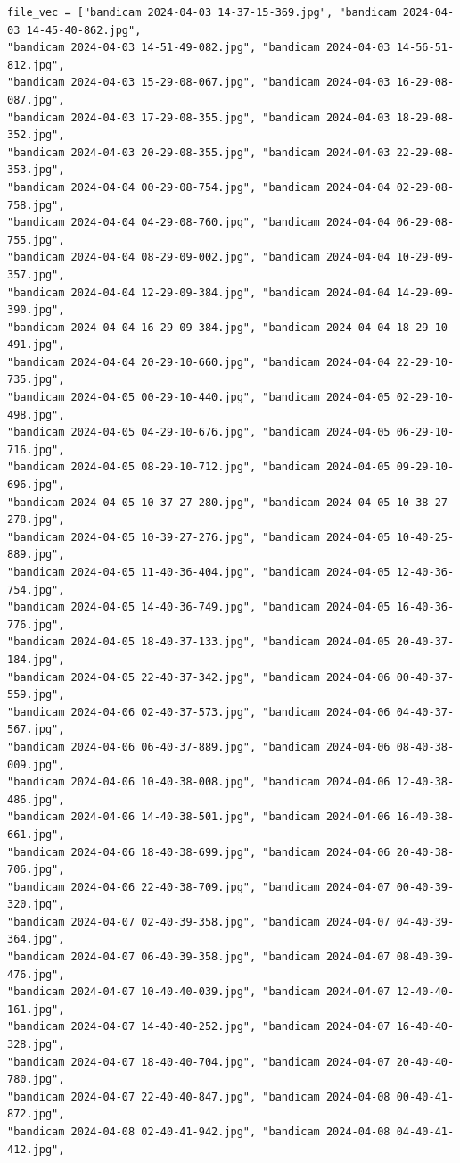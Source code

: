 \documentclass[11pt]{article}
\begin{document}
\begin{verbatim}
file_vec = ["bandicam 2024-04-03 14-37-15-369.jpg", "bandicam 2024-04-03 14-45-40-862.jpg",
"bandicam 2024-04-03 14-51-49-082.jpg", "bandicam 2024-04-03 14-56-51-812.jpg",
"bandicam 2024-04-03 15-29-08-067.jpg", "bandicam 2024-04-03 16-29-08-087.jpg",
"bandicam 2024-04-03 17-29-08-355.jpg", "bandicam 2024-04-03 18-29-08-352.jpg",
"bandicam 2024-04-03 20-29-08-355.jpg", "bandicam 2024-04-03 22-29-08-353.jpg",
"bandicam 2024-04-04 00-29-08-754.jpg", "bandicam 2024-04-04 02-29-08-758.jpg",
"bandicam 2024-04-04 04-29-08-760.jpg", "bandicam 2024-04-04 06-29-08-755.jpg",
"bandicam 2024-04-04 08-29-09-002.jpg", "bandicam 2024-04-04 10-29-09-357.jpg",
"bandicam 2024-04-04 12-29-09-384.jpg", "bandicam 2024-04-04 14-29-09-390.jpg",
"bandicam 2024-04-04 16-29-09-384.jpg", "bandicam 2024-04-04 18-29-10-491.jpg",
"bandicam 2024-04-04 20-29-10-660.jpg", "bandicam 2024-04-04 22-29-10-735.jpg",
"bandicam 2024-04-05 00-29-10-440.jpg", "bandicam 2024-04-05 02-29-10-498.jpg",
"bandicam 2024-04-05 04-29-10-676.jpg", "bandicam 2024-04-05 06-29-10-716.jpg",
"bandicam 2024-04-05 08-29-10-712.jpg", "bandicam 2024-04-05 09-29-10-696.jpg",
"bandicam 2024-04-05 10-37-27-280.jpg", "bandicam 2024-04-05 10-38-27-278.jpg",
"bandicam 2024-04-05 10-39-27-276.jpg", "bandicam 2024-04-05 10-40-25-889.jpg",
"bandicam 2024-04-05 11-40-36-404.jpg", "bandicam 2024-04-05 12-40-36-754.jpg",
"bandicam 2024-04-05 14-40-36-749.jpg", "bandicam 2024-04-05 16-40-36-776.jpg",
"bandicam 2024-04-05 18-40-37-133.jpg", "bandicam 2024-04-05 20-40-37-184.jpg",
"bandicam 2024-04-05 22-40-37-342.jpg", "bandicam 2024-04-06 00-40-37-559.jpg",
"bandicam 2024-04-06 02-40-37-573.jpg", "bandicam 2024-04-06 04-40-37-567.jpg",
"bandicam 2024-04-06 06-40-37-889.jpg", "bandicam 2024-04-06 08-40-38-009.jpg",
"bandicam 2024-04-06 10-40-38-008.jpg", "bandicam 2024-04-06 12-40-38-486.jpg",
"bandicam 2024-04-06 14-40-38-501.jpg", "bandicam 2024-04-06 16-40-38-661.jpg",
"bandicam 2024-04-06 18-40-38-699.jpg", "bandicam 2024-04-06 20-40-38-706.jpg",
"bandicam 2024-04-06 22-40-38-709.jpg", "bandicam 2024-04-07 00-40-39-320.jpg",
"bandicam 2024-04-07 02-40-39-358.jpg", "bandicam 2024-04-07 04-40-39-364.jpg",
"bandicam 2024-04-07 06-40-39-358.jpg", "bandicam 2024-04-07 08-40-39-476.jpg",
"bandicam 2024-04-07 10-40-40-039.jpg", "bandicam 2024-04-07 12-40-40-161.jpg",
"bandicam 2024-04-07 14-40-40-252.jpg", "bandicam 2024-04-07 16-40-40-328.jpg",
"bandicam 2024-04-07 18-40-40-704.jpg", "bandicam 2024-04-07 20-40-40-780.jpg",
"bandicam 2024-04-07 22-40-40-847.jpg", "bandicam 2024-04-08 00-40-41-872.jpg",
"bandicam 2024-04-08 02-40-41-942.jpg", "bandicam 2024-04-08 04-40-41-412.jpg",

\end{verbatim}
\end{document}
